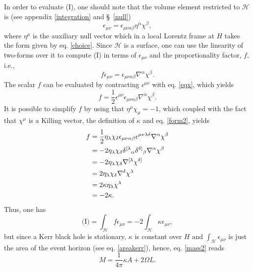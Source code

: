 \documentclass[
12pt,		%
openright,	%
twoside,  %
a4paper,			%
chapter=TITLE,		%
english,			%
french,				%
spanish,			%
brazil				%
]{USPSC-classe/USPSC}
\begin{document}
In order to evaluate (I), one should note that the volume element restricted to $\mathscr{H}$ is (see appendix \ref{integration} and \S~\ref{null})
\begin{equation}
    \epsilon_{\mu\nu}=\epsilon_{\mu\nu\alpha\beta}\eta^{\alpha}\chi^{\beta},
\end{equation}
where $\eta^{\mu}$ is the auxiliary null vector which in a local Lorentz frame at $H$ takes the form given by eq. \ref{choice}. Since $\mathscr{H}$ is a surface, one can use the linearity of two-forms over it to compute (I) in terms of $\epsilon_{\mu\nu}$ and the proportionality factor, $f$, i.e.,
\begin{equation}\label{eqx}
    f\epsilon_{\mu\nu}=\epsilon_{\mu\nu\alpha\beta}\nabla^{\alpha}\chi^{\beta}.
\end{equation}
The scalar $f$ can be evaluated by contracting $\epsilon^{\mu\nu}$ with eq. \ref{eqx}, which yields
\begin{equation}
    f=\frac{1}{2}\epsilon^{\mu\nu}\epsilon_{\mu\nu\alpha\beta}\nabla^{\alpha}\chi^{\beta}.
\end{equation}
It is possible to simplify $f$ by using that $\eta^{\mu}\chi_{\mu}=-1$, which coupled with the fact that $\chi^{\mu}$ is a Killing vector, the definition of $\kappa$ and eq. \ref{form2}, yields
\begin{equation}
\begin{aligned}[b]
    f & =\frac{1}{2}\eta_{\lambda}\chi_{\delta}\epsilon_{\mu\nu\alpha\beta}\epsilon^{\mu\nu\lambda\delta}\nabla^{\alpha}\chi^{\beta}\\
    &= -2\eta_{\lambda}\chi_{\delta}\delta^{[\lambda}\mathstrut_{\alpha}\delta^{\delta]}\mathstrut_{\beta}\nabla^{\alpha}\chi^{\beta}\\
    & =-2\eta_{\lambda}\chi_{\delta}\nabla^{[\lambda}\chi^{\delta]}\\
    & = 2\eta_{\lambda}\chi_{\delta}\nabla^{\delta}\chi^{\lambda}\\
    &= 2\kappa\eta_{\lambda}\chi^{\lambda}\\
    & = -2\kappa.
\end{aligned}
\end{equation}
Thus, one has
\begin{equation}
    \text{(I)}=\int_{\mathscr{H}}f\epsilon_{\mu\nu}=-2\int_{\mathscr{H}}\kappa\epsilon_{\mu\nu},
\end{equation}
but since a Kerr black hole is stationary, $\kappa$ is constant over $H$ and $\int_{\mathscr{H}}\epsilon_{\mu\nu}$ is just the area of the event horizon (see eq. \ref{areakerr}), hence, eq. \ref{mass2} reads
\begin{equation}\label{mass3}
    M=\frac{1}{4\pi}\kappa A+2\Omega L.
\end{equation}
\end{document}
